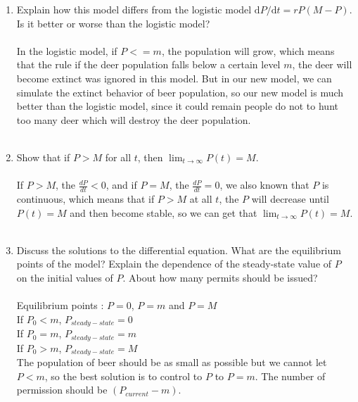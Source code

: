 \documentclass[12pt,a4paper]{article}
\newcommand{\dd}{\mathrm{d}}
\begin{document}
\begin{spacing}{1.2}
\begin{enumerate}[label={\textbf{\alph*.}}]
    \item Explain how this model differs from the logistic model $\dd P/\dd t=rP(M-P)$. Is it better or worse than the logistic model?
    \\\\
    In the logistic model, if $P <= m$, the population will grow, which means that the rule if the deer population falls below a certain level $m$, the deer will become extinct was ignored in this model. But in our new model, we can simulate the extinct behavior of beer population, so our new model is much better than the logistic model, since it could remain people do not to hunt too many deer which will destroy the deer population.\\\\

    \item Show that if $P>M$ for all $t$, then $\lim_{t\to\infty}P(t)=M$. 
	\\\\
	If $P > M$, the $\frac{dP}{dt} < 0$, and if $P = M$, the $\frac{dP}{dt} = 0$, we also known that $P$ is continuous, which means that if $P > M$ at all $t$, the $P$ will decrease until $P(t)=M$ and then become stable, so we can get that $\lim_{t\to\infty}P(t)=M$.\\\\

    \item Discuss the solutions to the differential equation. What are the equilibrium points of the model? Explain the dependence of the steady-state value of $P$ on the initial values of $P$. About how many permits should be issued?
    \\\\
    Equilibrium points : $P=0$, $P=m$ and $P=M$\\
    If $P_0<m$, $P_{steady-state}=0$ \\
    If $P_0=m$, $P_{steady-state}=m$ \\
    If $P_0>m$, $P_{steady-state}=M$ \\
    The population of beer should be as small as possible but we cannot let $P<m$, so the best solution is to control to $P$ to $P=m$. The number of permission should be $(P_{current}-m)$.
    



\end{enumerate}
\end{spacing}
\end{document}
